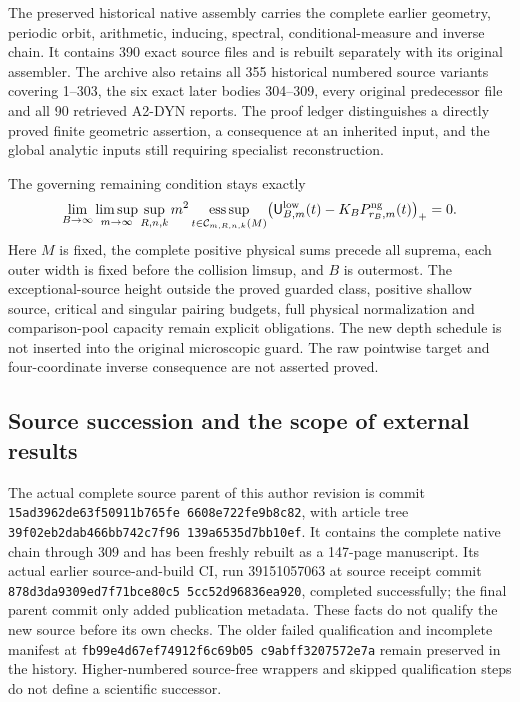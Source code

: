 \documentclass[11pt,reqno]{amsart}
\numberwithin{equation}{section}
\theoremstyle{definition}\newtheorem{definition}[theorem]{Definition}
\theoremstyle{remark}\newtheorem{remark}[theorem]{Remark}
\begin{document}
The preserved historical native assembly carries the complete
earlier geometry, periodic orbit, arithmetic, inducing, spectral,
conditional-measure and inverse chain.  It contains 390 exact
source files and is rebuilt separately with its original assembler.
The archive also retains all 355 historical numbered source variants
covering 1--303, the six exact later bodies 304--309, every original
predecessor file and all 90
retrieved A2-DYN reports.  The proof ledger distinguishes a directly
proved finite geometric assertion, a consequence at an inherited
input, and the global analytic inputs still requiring specialist
reconstruction.

The governing remaining condition stays exactly
\begin{equation}\label{eq:sc-original-obligation}
 \lim_{B\to\infty}\limsup_{m\to\infty}\sup_{R,n,k}
 m^2\operatorname*{ess\,sup}_{t\in\mathcal C_{m,R,n,k}(M)}
 \bigl(\mathsf U^{\rm low}_{B,m}(t)
                   -K_BP^{\rm ng}_{r_B,m}(t)\bigr)_+=0 .
\end{equation}
Here $M$ is fixed, the complete positive physical sums precede all
suprema, each outer width is fixed before the collision limsup,
and $B$ is outermost.  The exceptional-source height outside the proved guarded class, positive
shallow source, critical and singular pairing budgets, full
physical normalization and comparison-pool capacity remain
explicit obligations.  The new depth schedule is not inserted
into the original microscopic guard.  The raw pointwise target
and four-coordinate inverse consequence are not asserted proved.

\subsection*{Source succession and the scope of external results}
The actual complete source parent of this author revision is
commit
\texttt{15ad3962\allowbreak de63f509\allowbreak 11b765fe\allowbreak
6608e722\allowbreak fe9b8c82},
with article tree
\texttt{39f02eb2\allowbreak dab466bb\allowbreak 742c7f96\allowbreak
139a6535\allowbreak d7bb10ef}.
It contains the complete native chain through 309 and has been
freshly rebuilt as a 147-page manuscript. Its actual earlier
source-and-build CI, run 39151057063 at source receipt commit
\texttt{878d3da9\allowbreak 309ed7f7\allowbreak 1bce80c5\allowbreak
5cc52d96\allowbreak 836ea920}, completed successfully;
the final parent commit only added publication metadata.
These facts do not qualify the new source before its own checks.
The older failed qualification and incomplete manifest at
\texttt{fb99e4d6\allowbreak 7ef74912\allowbreak f6c69b05\allowbreak
c9abff32\allowbreak 07572e7a} remain preserved in the history.
Higher-numbered source-free wrappers and skipped qualification
steps do not define a scientific successor.
\end{document}
